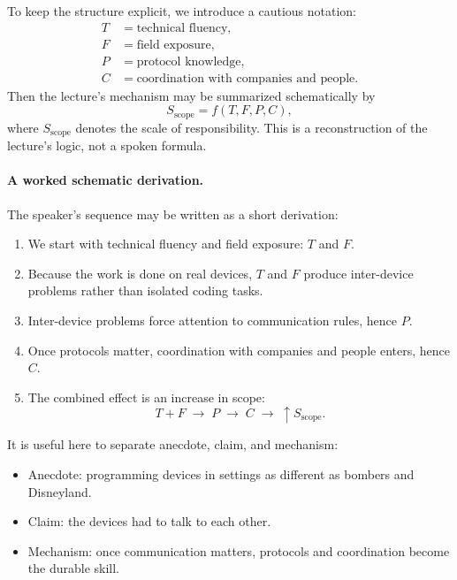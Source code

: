 To keep the structure explicit, we introduce a cautious notation:
\begin{align}
T &= \text{technical fluency}, \\
F &= \text{field exposure}, \\
P &= \text{protocol knowledge}, \\
C &= \text{coordination with companies and people}.
\end{align}
Then the lecture's mechanism may be summarized schematically by
\begin{equation}
S_{\text{scope}} = f(T,F,P,C),
\end{equation}
where \(S_{\text{scope}}\) denotes the scale of responsibility. This is a reconstruction of the lecture's logic, not a spoken formula.

\paragraph{A worked schematic derivation.}
The speaker's sequence may be written as a short derivation:
\begin{enumerate}
\item We start with technical fluency and field exposure: \(T\) and \(F\).
\item Because the work is done on real devices, \(T\) and \(F\) produce inter-device problems rather than isolated coding tasks.
\item Inter-device problems force attention to communication rules, hence \(P\).
\item Once protocols matter, coordination with companies and people enters, hence \(C\).
\item The combined effect is an increase in scope:
\begin{equation}
T + F \;\to\; P \;\to\; C \;\to\; \uparrow S_{\text{scope}}.
\end{equation}
\end{enumerate}

It is useful here to separate anecdote, claim, and mechanism:
\begin{itemize}
\item Anecdote: programming devices in settings as different as bombers and Disneyland.
\item Claim: the devices had to talk to each other.
\item Mechanism: once communication matters, protocols and coordination become the durable skill.
\end{itemize}


